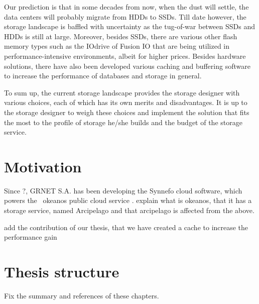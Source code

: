 Our prediction is that in some decades from now, when the dust will settle, the 
data centers will probably migrate from HDDs to SSDs. Till date however, the 
storage landscape is baffled with uncertainty as the tug-of-war between SSDs 
and HDDs is still at large. Moreover, besides SSDs, there are various other 
flash memory types such as the IOdrive of Fusion IO that are being utilized in 
performance-intensive environments, albeit for higher prices. Besides hardware 
solutions, there have also been developed various caching and buffering 
software to increase the performance of databases and storage in general. 

To sum up, the current storage landscape provides the storage designer with 
various choices, each of which has its own merits and disadvantages. It is up 
to the storage designer to weigh these choices and implement the solution that 
fits the most to the profile of storage he/she builds and the budget of the 
storage service.

\section{Motivation}

Since ?, GRNET S.A. \cite{grnet} has been developing the Synnefo \cite{synnefo} 
cloud software, which powers the ~okeanos public cloud service \cite{okeanos}.
\fixme explain what is okeanos, that it has a storage service, named Arcipelago 
and that arcipelago is affected from the above.

\todo add the contribution of our thesis, that we have created a cache to 
increase the performance gain

\section{Thesis structure}

\fixme Fix the summary and references of these chapters.


